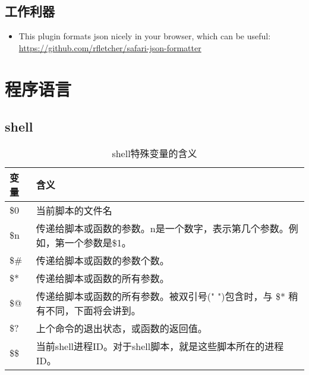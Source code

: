 \documentclass[utf8,a4paper,10pt]{ctexbook}
\begin{document}
\chapter{工作利器}

\begin{itemize}
    \item This plugin formats json nicely in your browser, which can be useful:
          \url{https://github.com/rfletcher/safari-json-formatter}

\end{itemize}

\part{程序语言}

\chapter{shell}


\begin{table}[H]
    \begin{tabular}{|l|l|}
        \hline
        变量 & 含义 \\
        \hline
        \$0 & 当前脚本的文件名 \\
        \hline
        \$n & 传递给脚本或函数的参数。n是一个数字，表示第几个参数。例如，第一个参数是\$1。\\
        \hline
        \$\# & 传递给脚本或函数的参数个数。\\
        \hline
        \$* & 传递给脚本或函数的所有参数。\\
        \hline
        \$@ & 传递给脚本或函数的所有参数。被双引号(" ")包含时，与 \$* 稍有不同，下面将会讲到。\\
        \hline
        \$? & 上个命令的退出状态，或函数的返回值。\\
        \hline
        \$\$ & 当前shell进程ID。对于shell脚本，就是这些脚本所在的进程ID。\\
        \hline
    \end{tabular}
    \caption{shell特殊变量的含义}
\end{table}
\end{document}
